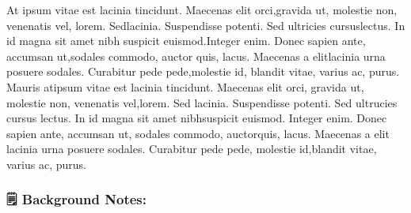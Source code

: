\documentclass[11pt]{article}
\begin{document}
At ipsum vitae est lacinia tincidunt. Maecenas elit orci,gravida ut, molestie non, venenatis vel, lorem. Sedlacinia. Suspendisse potenti. Sed ultricies cursuslectus. In id magna sit amet nibh suspicit euismod.Integer enim. Donec sapien ante, accumsan ut,sodales commodo, auctor quis, lacus. Maecenas a elitlacinia urna posuere sodales. Curabitur pede pede,molestie id, blandit vitae, varius ac, purus. Mauris atipsum vitae est lacinia tincidunt. Maecenas elit orci, gravida ut, molestie non, venenatis vel,lorem. Sed lacinia. Suspendisse potenti. Sed ultrucies cursus lectus. In id magna sit amet nibhsuspicit euismod. Integer enim. Donec sapien ante, accumsan ut, sodales commodo, auctorquis, lacus. Maecenas a elit lacinia urna posuere sodales. Curabitur pede pede, molestie id,blandit vitae, varius ac, purus.

\subsubsection{🗒 Background Notes:}
\label{sec:org08e4187}
\end{document}
